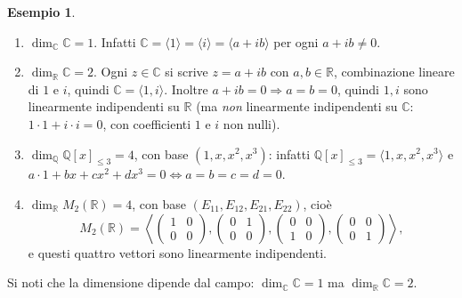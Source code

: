 \documentclass[11pt,a4paper]{article}
\newcommand{\RR}{\mathbb{R}}
\newcommand{\CC}{\mathbb{C}}
\theoremstyle{plain}
\theoremstyle{definition}
\newtheorem{esempio}[prop]{Esempio}
\theoremstyle{remark}
\begin{document}
\begin{esempio}\label{es:dimensioni}
\begin{enumerate}[label=(\arabic*)]
  \item $\dim_{\CC}\CC=1$. Infatti $\CC=\langle1\rangle=\langle i\rangle=\langle a+ib\rangle$ per ogni $a+ib\neq0$.
  \item $\dim_{\RR}\CC=2$. Ogni $z\in\CC$ si scrive $z=a+ib$ con $a,b\in\RR$, combinazione lineare di $1$ e $i$, quindi $\CC=\langle1,i\rangle$. Inoltre $a+ib=0\Rightarrow a=b=0$, quindi $1,i$ sono linearmente indipendenti su $\RR$ (ma \emph{non} linearmente indipendenti su $\CC$: $1\cdot1+i\cdot i=0$, con coefficienti $1$ e $i$ non nulli).
  \item $\dim_{\mathbb{Q}}\mathbb{Q}[x]_{\le3}=4$, con base $(1,x,x^2,x^3)$: infatti $\mathbb{Q}[x]_{\le3}=\langle1,x,x^2,x^3\rangle$ e
  $a\cdot1+bx+cx^2+dx^3=0\iff a=b=c=d=0$.
  \item $\dim_{\RR}M_2(\RR)=4$, con base $(E_{11},E_{12},E_{21},E_{22})$, cioè
  \[
    M_2(\RR)=\left\langle
    \begin{pmatrix}1&0\\0&0\end{pmatrix},
    \begin{pmatrix}0&1\\0&0\end{pmatrix},
    \begin{pmatrix}0&0\\1&0\end{pmatrix},
    \begin{pmatrix}0&0\\0&1\end{pmatrix}
    \right\rangle ,
  \]
  e questi quattro vettori sono linearmente indipendenti.
\end{enumerate}
Si noti che la dimensione dipende dal campo: $\dim_{\CC}\CC=1$ ma $\dim_{\RR}\CC=2$.
\end{esempio}
\end{document}
